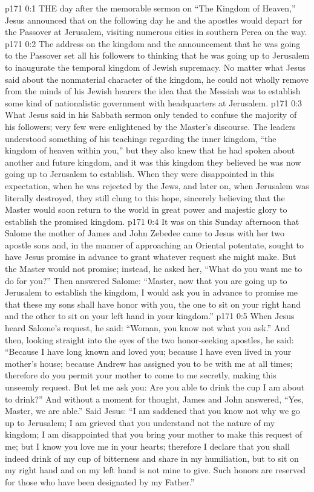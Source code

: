 \vs p171 0:1 THE day after the memorable sermon on “The Kingdom of Heaven,” Jesus announced that on the following day he and the apostles would depart for the Passover at Jerusalem, visiting numerous cities in southern Perea on the way.
\vs p171 0:2 The address on the kingdom and the announcement that he was going to the Passover set all his followers to thinking that he was going up to Jerusalem to inaugurate the temporal kingdom of Jewish supremacy. No matter what Jesus said about the nonmaterial character of the kingdom, he could not wholly remove from the minds of his Jewish hearers the idea that the Messiah was to establish some kind of nationalistic government with headquarters at Jerusalem.
\vs p171 0:3 What Jesus said in his Sabbath sermon only tended to confuse the majority of his followers; very few were enlightened by the Master’s discourse. The leaders understood something of his teachings regarding the inner kingdom, \textcolor{ubdarkred}{“the kingdom of heaven within you,”} but they also knew that he had spoken about another and future kingdom, and it was this kingdom they believed he was now going up to Jerusalem to establish. When they were disappointed in this expectation, when he was rejected by the Jews, and later on, when Jerusalem was literally destroyed, they still clung to this hope, sincerely believing that the Master would soon return to the world in great power and majestic glory to establish the promised kingdom.
\vs p171 0:4 \pc It was on this Sunday afternoon that Salome the mother of James and John Zebedee came to Jesus with her two apostle sons and, in the manner of approaching an Oriental potentate, sought to have Jesus promise in advance to grant whatever request she might make. But the Master would not promise; instead, he asked her, \textcolor{ubdarkred}{“What do you want me to do for you?”} Then answered Salome: “Master, now that you are going up to Jerusalem to establish the kingdom, I would ask you in advance to promise me that these my sons shall have honor with you, the one to sit on your right hand and the other to sit on your left hand in your kingdom.”
\vs p171 0:5 When Jesus heard Salome’s request, he said: \textcolor{ubdarkred}{“Woman, you know not what you ask.”} And then, looking straight into the eyes of the two honor\hyp{}seeking apostles, he said: \textcolor{ubdarkred}{“Because I have long known and loved you; because I have even lived in your mother’s house; because Andrew has assigned you to be with me at all times; therefore do you permit your mother to come to me secretly, making this unseemly request. But let me ask you: Are you able to drink the cup I am about to drink?”} And without a moment for thought, James and John answered, “Yes, Master, we are able.” Said Jesus: \textcolor{ubdarkred}{“I am saddened that you know not why we go up to Jerusalem; I am grieved that you understand not the nature of my kingdom; I am disappointed that you bring your mother to make this request of me; but I know you love me in your hearts; therefore I declare that you shall indeed drink of my cup of bitterness and share in my humiliation, but to sit on my right hand and on my left hand is not mine to give. Such honors are reserved for those who have been designated by my Father.”}
